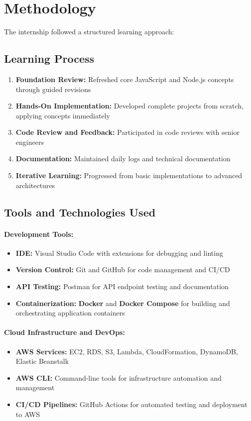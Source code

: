 \section{Methodology}

The internship followed a structured learning approach:

\subsection{Learning Process}

\begin{enumerate}
    \item \textbf{Foundation Review:} Refreshed core JavaScript and Node.js concepts through guided revisions
    \item \textbf{Hands-On Implementation:} Developed complete projects from scratch, applying concepts immediately
    \item \textbf{Code Review and Feedback:} Participated in code reviews with senior engineers
    \item \textbf{Documentation:} Maintained daily logs and technical documentation
    \item \textbf{Iterative Learning:} Progressed from basic implementations to advanced architectures
\end{enumerate}

\subsection{Tools and Technologies Used}

\paragraph{Development Tools:}
\begin{itemize}
    \item \textbf{IDE:} Visual Studio Code with extensions for debugging and linting
    \item \textbf{Version Control:} Git and GitHub for code management and CI/CD
    \item \textbf{API Testing:} Postman for API endpoint testing and documentation
    \item \textbf{Containerization:} \textbf{Docker} and \textbf{Docker Compose} for building and orchestrating application containers
\end{itemize}

\paragraph{Cloud Infrastructure and DevOps:}
\begin{itemize}
    \item \textbf{AWS Services:} EC2, RDS, S3, Lambda, CloudFormation, DynamoDB, Elastic Beanstalk
    \item \textbf{AWS CLI:} Command-line tools for infrastructure automation and management
    \item \textbf{CI/CD Pipelines:} GitHub Actions for automated testing and deployment to AWS
\end{itemize}

